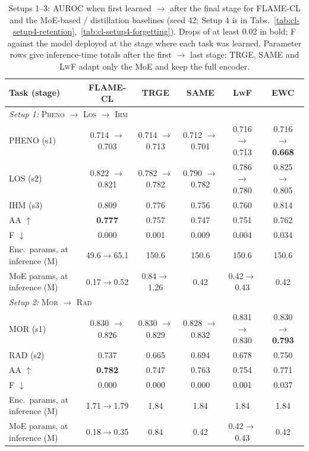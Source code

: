 \begin{table}[t]
\centering
\footnotesize
\setlength{\tabcolsep}{3.5pt}
\caption{Setups 1--3: AUROC when first learned $\to$ after the final stage for \textsc{FLAME-CL} and the MoE-based / distillation baselines (seed 42; Setup 4 is in Tabs.~\ref{tab:cl-setup4-retention},~\ref{tab:cl-setup4-forgetting}). Drops of at least 0.02 in bold; F against the model deployed at the stage where each task was learned. Parameter rows give inference-time totals after the first $\to$ last stage: TRGE, SAME and L\textsc{w}F adapt only the MoE and keep the full encoder.}
\label{tab:cl-new-baselines-s123}
\begin{tabular}{lccccc}
\toprule
Task (stage) & \textsc{FLAME-CL} & TRGE & SAME & L\textsc{w}F & EWC \\
\midrule
\multicolumn{6}{l}{\emph{Setup 1:} \textsc{Pheno} $\to$ \textsc{Los} $\to$ \textsc{Ihm}} \\
\addlinespace[1pt]
PHENO (s1) & 0.714 $\to$ 0.703 & 0.714 $\to$ 0.713 & 0.712 $\to$ 0.701 & 0.716 $\to$ 0.713 & 0.716 $\to$ \textbf{0.668} \\
LOS (s2) & 0.822 $\to$ 0.821 & 0.782 $\to$ 0.782 & 0.790 $\to$ 0.782 & 0.786 $\to$ 0.780 & 0.825 $\to$ 0.805 \\
IHM (s3) & 0.809 & 0.776 & 0.756 & 0.760 & 0.814 \\
\addlinespace[1pt]
AA $\uparrow$ & \textbf{0.777} & 0.757 & 0.747 & 0.751 & 0.762 \\
F $\downarrow$ & 0.000 & 0.001 & 0.009 & 0.004 & 0.034 \\
Enc.\ params, at inference (M) & 49.6$\to$65.1 & 150.6 & 150.6 & 150.6 & 150.6 \\
MoE params, at inference (M) & 0.17$\to$0.52 & 0.84$\to$1.26 & 0.42 & 0.42$\to$0.43 & 0.42 \\
\midrule
\multicolumn{6}{l}{\emph{Setup 2:} \textsc{Mor} $\to$ \textsc{Rad}} \\
\addlinespace[1pt]
MOR (s1) & 0.830 $\to$ 0.826 & 0.830 $\to$ 0.829 & 0.828 $\to$ 0.832 & 0.831 $\to$ 0.830 & 0.830 $\to$ \textbf{0.793} \\
RAD (s2) & 0.737 & 0.665 & 0.694 & 0.678 & 0.750 \\
\addlinespace[1pt]
AA $\uparrow$ & \textbf{0.782} & 0.747 & 0.763 & 0.754 & 0.771 \\
F $\downarrow$ & 0.000 & 0.000 & 0.000 & 0.001 & 0.037 \\
Enc.\ params, at inference (M) & 1.71$\to$1.79 & 1.84 & 1.84 & 1.84 & 1.84 \\
MoE params, at inference (M) & 0.18$\to$0.35 & 0.84 & 0.42 & 0.42$\to$0.43 & 0.42 \\

\end{tabular}
\end{table}
